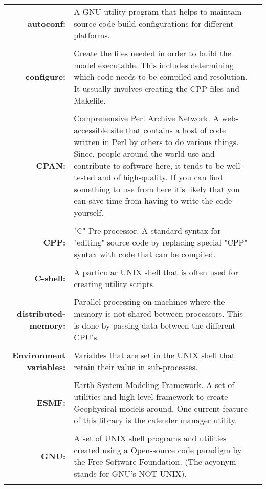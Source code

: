 \documentclass[]{article}
\begin{document}
\begin{tabular}{r p{1.3in} p{2in}}

{\bf autoconf:} & A GNU utility program that helps to maintain source code build configurations
for different platforms. \\ \\

{\bf configure:} & Create the files needed in order to build the model executable. This
includes determining which code needs to be compiled and resolution. It ussually involves
creating the CPP files and Makefile. \\ \\

{\bf CPAN:} & Comprehensive Perl Archive Network. A web-accessible site that contains
a host of code written in Perl by others to do various things. Since, people around the
world use and contribute to software here, it tends to be well-tested and of high-quality.
If you can find something to use from here it's likely that you can save time from having
to write the code yourself. \\ \\

{\bf CPP:} & "C" Pre-processor. A standard syntax for "editing" source code
by replacing special "CPP" syntax with code that can be compiled.  \\ \\

{\bf C-shell:} & A particular UNIX shell that is often used for creating utility scripts. \\ \\

{\bf distributed-memory:} & Parallel processing on machines where the memory is not
shared between processors. This is done by passing data between the different CPU's. \\ \\

{\bf Environment variables:} & Variables that are set in the UNIX shell that retain
their value in sub-processes. \\ \\

{\bf ESMF:} & Earth System Modeling Framework. A set of utilities and high-level
framework to create Geophysical models around. One current feature of this library
is the calender manager utility. \\ \\

{\bf GNU:} & A set of UNIX shell programs and utilities created using a Open-source
code paradigm by the Free Software Foundation. (The acyonym stands for GNU's NOT UNIX). \\ \\


\end{tabular}
\end{document}
